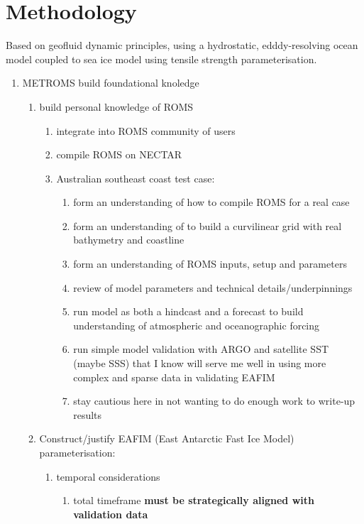 \documentclass[11pt,a4paper]{article}
\begin{document}
\section*{Methodology}
%

Based on geofluid dynamic principles, using a hydrostatic, edddy-resolving ocean
model coupled to sea ice model using tensile strength parameterisation.

\begin{enumerate}
\item METROMS build foundational knoledge
  \begin{enumerate}
  \item build personal knowledge of ROMS
    \begin{enumerate}
    \item integrate into ROMS community of users
    \item compile ROMS on NECTAR
    \item Australian southeast coast test case:
      \begin{enumerate}
      \item form an understanding of how to compile ROMS for a real case
      \item form an understanding of to build a curvilinear grid with real bathymetry and coastline
      \item form an understanding of ROMS inputs, setup and parameters
      \item review of model parameters and technical details/underpinnings
      \item run model as both a hindcast and a forecast to build understanding of atmospheric and oceanographic forcing
      \item run simple model validation with ARGO and satellite SST (maybe SSS) that I know will serve me well in using more complex and sparse data in validating EAFIM
      \item stay cautious here in not wanting to do enough work to write-up results
      \end{enumerate}
    \end{enumerate}
  \item Construct/justify EAFIM (East Antarctic Fast Ice Model) parameterisation:
    \begin{enumerate}
    \item temporal considerations
      \begin{enumerate}
      \item total timeframe \textbf{must be strategically aligned with validation data}

\end{enumerate}
\end{enumerate}
\end{enumerate}
\end{enumerate}
\end{document}
